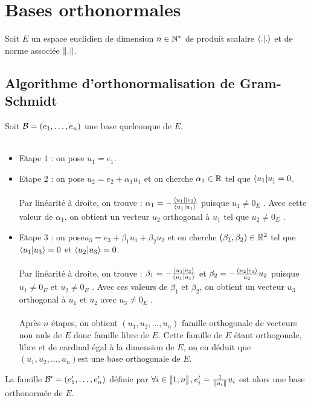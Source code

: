\section{Bases orthonormales}
    Soit \(E\) un espace euclidien de dimension \(n \in \Ns\) de produit scalaire \(\scal{.}{.}\) et de norme associée \(\norme{.}\).

\subsection{Algorithme d’orthonormalisation de Gram-Schmidt}
\begin{defprop}
    Soit \(\cal{B} = (e_1, \dots , e_n)\) une base quelconque de \(E\).\\~\\
    \begin{itemize}
        \item Etape \(1\) : on pose \(u_1 = e_1\).
        \item Etape \(2\) : on pose \(u_2 = e_2+ \alpha_1u_1\) et on cherche \(\alpha_1 \in \R\) tel que \(\scal{u_1}{u_} = 0\).\\~\\
        Par linéarité à droite, on trouve : \(\alpha_1 = - \frac{\scal{u_1|}{e_2}}{\scal{u_1}{u_1}}\) puisque \(u_1\neq 0_E\) . Avec cette valeur de \(\alpha_1\), on obtient un vecteur \(u_2\) orthogonal à \(u_1\) tel que \(u_2\neq 0_E\) .
        \item Etape \(3\) : on pose\( u_3 = e_3 + \beta_1u_1 + \beta_2u_2\) et on cherche \((\beta_1, \beta_2) \in \R^2\) tel que \(\scal{u_1}{u_3} = 0\) et \(\scal{u_2}{u_3} = 0\).\\~\\
        Par linéarité à droite, on trouve : \(\beta_1 = - \frac{\scal{u_1}{e_3}}{\scal{u_1}{u_1 }}\) et \(\beta_2 = - \frac{\scal{u_2}{e_3}}{u_2}{u_2}\) puisque \(u_1\neq 0_E\) et \(u_2\neq 0_E\) . Avec ces valeurs de \(\beta_1\) et \(\beta_2\), on obtient un vecteur \(u_3\) orthogonal à \(u_1\) et \(u_2\) avec \(u_3\neq 0_E\) .\\~\\
        Après \(n\) étapes, on obtient \((u_1, u_2, \dots , u_n)\) famille orthogonale de vecteurs non nuls de \(E\) donc famille libre de \(E\). Cette famille de \(E\) étant orthogonale, libre et de cardinal égal à la dimension de \(E\), on en déduit que \((u_1, u_2, \dots , u_n)\)est une base orthogonale de \(E\).
    \end{itemize}
    La famille \(\cal{B}' = (e'_1, \dots , e'_n)\) définie par \(\forall i \in \interventierii{1}{n}, e'_i = \frac{1}{\norme{u_i}}u_i\) est alors une base orthonormée de \(E\).
\end{defprop}
